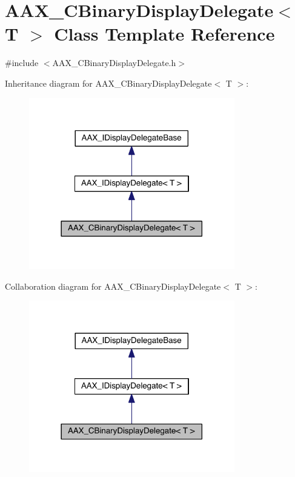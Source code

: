 \hypertarget{a00012}{}\section{A\+A\+X\+\_\+\+C\+Binary\+Display\+Delegate$<$ T $>$ Class Template Reference}
\label{a00012}


{\ttfamily \#include $<$A\+A\+X\+\_\+\+C\+Binary\+Display\+Delegate.\+h$>$}



Inheritance diagram for A\+A\+X\+\_\+\+C\+Binary\+Display\+Delegate$<$ T $>$\+:
\nopagebreak
\begin{figure}[H]
\begin{center}
\leavevmode
\includegraphics[width=254pt]{a00396}
\end{center}
\end{figure}


Collaboration diagram for A\+A\+X\+\_\+\+C\+Binary\+Display\+Delegate$<$ T $>$\+:
\nopagebreak
\begin{figure}[H]
\begin{center}
\leavevmode
\includegraphics[width=254pt]{a00397}
\end{center}
\end{figure}



